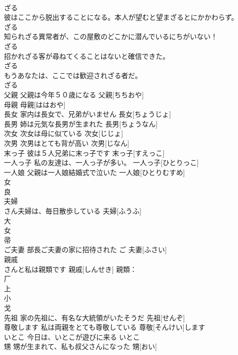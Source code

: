 \documentclass[8pt]{extreport}
\begin{document}
\begin{CJK}{UTF8}{min}
\\	ざる
\\	彼はここから脱出することになる。本人が望むと望まざるとにかかわらず。	
\\	ざる
\\	知られざる異常者が、この屋敷のどこかに潜んでいるにちがいない！	
\\	ざる
\\	招かれざる客が尋ねてくることはないと確信できた。	
\\	ざる
\\	もうあなたは、ここでは歓迎されざる者だ。	
\\	ざる
\\	父親	父親は今年５０歳になる	父親[ちちおや]			
\\	母親		母親[ははおや]			
\\	長女	家内は長女で、兄弟がいません	長女[ちょうじょ]			
\\	長男	姉は元気な長男が生まれた	長男[ちょうなん]			
\\	次女	次女は母に似ている	次女[じじょ]			
\\	次男	次男はとても背が高い	次男[じなん]			
\\	末っ子	彼は５人兄弟に末っ子です	末っ子[すえっこ]			
\\	一人っ子	私の友達は、一人っ子が多い。	一人っ子[ひとりっこ]			
\\	一人娘	父親は一人娘結婚式で泣いた	一人娘[ひとりむすめ]			
\\	女 
\\	良 
\\	夫婦	
\\	さん夫婦は、毎日散歩している	夫婦[ふうふ]			
\\	大 
\\	女 
\\	帚 
\\	ご夫妻	部長ご夫妻の家に招待された	ご 夫妻[ふさい]			
\\	親戚	
\\	さんと私は親類です	親戚[しんせき]			親類：
\\	厂 
\\	上 
\\	小 
\\	戈 
\\	先祖	家の先祖に、有名な大統領がいたそうだ	先祖[せんぞ]			
\\	尊敬します	私は両親をとても尊敬している	尊敬[そんけい]します			
\\	いとこ	今日は、いとこが遊びに来る	いとこ			
\\	甥	甥が生まれて、私も叔父さんになった	甥[おい]			

\end{CJK}
\end{document}
